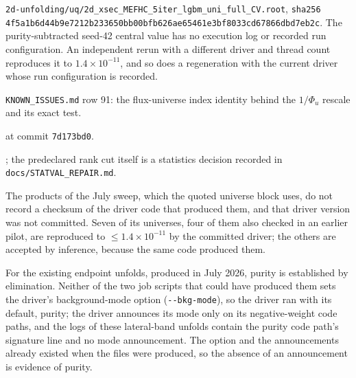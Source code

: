 \begin{description}[leftmargin=0pt,itemsep=3pt]
  \item[\texttt{2d-central-value}.] \texttt{2d-unfolding/}\allowbreak\texttt{uq/}\allowbreak\texttt{2d\_xsec\_MEFHC\_5iter\_}\allowbreak\texttt{lgbm\_uni\_full\_CV.root}, \texttt{sha256} \texttt{4f5a1b6d44b9e721}\allowbreak\texttt{2b233650bb00bfb6}\allowbreak\texttt{26ae65461e3bf803}\allowbreak\texttt{3cd67866dbd7eb2c}. The purity-subtracted seed-42 central value has no execution log or recorded run configuration. An independent rerun with a different driver and thread count reproduces it to $1.4\times10^{-11}$, and so does a regeneration with the current driver whose run configuration is recorded.
  \item[\texttt{flux-index}.] \texttt{KNOWN\_ISSUES.md} row 91: the flux-universe index identity behind the $1/\Phi_{u}$ rescale and its exact test.
  \item[\texttt{response-diagnostic}.]  at commit \texttt{7d173bd0}.
  \item[\texttt{rank-inversion}.] ; the predeclared rank cut itself is a statistics decision recorded in \texttt{docs/}\allowbreak\texttt{STATVAL\_REPAIR.md}.
  \item[\texttt{july-sweep}.] The products of the July sweep, which the quoted universe block uses, do not record a checksum of the driver code that produced them, and that driver version was not committed. Seven of its universes, four of them also checked in an earlier pilot, are reproduced to $\le1.4\times10^{-11}$ by the committed driver; the others are accepted by inference, because the same code produced them.
  \item[\texttt{bkg-mode-elimination}.] For the existing endpoint unfolds, produced in July 2026, purity is established by elimination. Neither of the two job scripts that could have produced them sets the driver's background-mode option (\texttt{-{}-bkg-mode}), so the driver ran with its default, purity; the driver announces its mode only on its negative-weight code paths, and the logs of these lateral-band unfolds contain the purity code path's signature line and no mode announcement. The option and the announcements already existed when the files were produced, so the absence of an announcement is evidence of purity.

\end{description}
